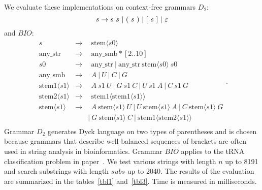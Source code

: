 We evaluate these implementations on context-free grammars $D_2$: 
$$
s  \rightarrow  s \ s \ | \ ( \ s \ ) \ | \ [ \ s \ ] \ | \ \varepsilon \\
$$ and $BIO$: \[
    \begin{array}{rcl}
            s & \rightarrow & \ \ \text{stem}\langle s0 \rangle \\
            \text{any\_str} & \rightarrow & \ \ \text{any\_smb}*[2..10] \\
            s0 & \rightarrow & \ \ \text{any\_str} \ | \ \text{any\_str} \ \text{stem}\langle s0 \rangle \ s0 \\
            \text{any\_smb} & \rightarrow &  \ \ A \ | \ U \ | \ C \ | \  G \\
            \text{stem1}\langle s1 \rangle & \rightarrow & \ \ A \ s1 \  U \ | \ G \ s1 \ C \ | \ U \ s1 \ A \ | \ C \ s1 \ G \\
            \text{stem2}\langle s1 \rangle & \rightarrow & \ \ \text{stem1}\langle \text{stem1}\langle s1 \rangle \rangle \\
            \text{stem}\langle s1 \rangle & \rightarrow & \ \ A \ \text{stem}\langle s1 \rangle \ U
              \ | \ U \ \text{stem}\langle s1 \rangle \ A \ | \ C \ \text{stem}\langle s1 \rangle \ G \\
              & & | \ G \ \text{stem}\langle s1 \rangle \ C 
              \  | \ \text{stem1}\langle \text{stem2}\langle s1 \rangle \rangle \\
    \end{array}.
    \]
Grammar $D_2$ generates Dyck language on two types of parentheses and is chosen because grammars that describe well-balanced sequences of brackets are often used in string analysis in bioinformatics. 
Grammar $BIO$ applies to the tRNA classification problem in paper~\cite{bioinformatics19}.
We test various strings with length $n$ up to 8191 and search substrings with length $subs$ up to 2040. The results of the evaluation are summarized in the tables~\ref{tbl1} and~\ref{tbl3}. Time is measured in milliseconds.



